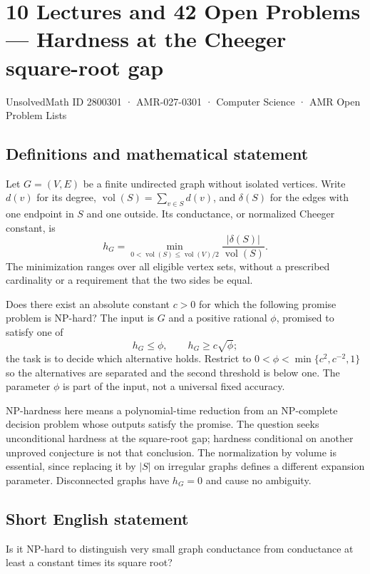 \documentclass[11pt,a4paper]{article}
\begin{document}
\section*{10 Lectures and 42 Open Problems — Hardness at the Cheeger square-root gap}\label{2800301}
{\small UnsolvedMath ID 2800301 · AMR-027-0301 · Computer Science · AMR Open Problem Lists}
\subsection{Definitions and mathematical statement}
Let $G=(V,E)$ be a finite undirected graph without isolated vertices.
Write $d(v)$ for its degree, $\operatorname{vol}(S)=\sum_{v\in S}d(v)$,
and $\delta(S)$ for the edges with one endpoint in $S$ and one outside.
Its conductance, or normalized Cheeger constant, is
\[
 h_G=\min_{0<\operatorname{vol}(S)\le\operatorname{vol}(V)/2}
                   \frac{|\delta(S)|}{\operatorname{vol}(S)}.
\]
The minimization ranges over all eligible vertex sets, without a
prescribed cardinality or a requirement that the two sides be equal.

Does there exist an absolute constant $c>0$ for which the following
promise problem is NP-hard? The input is $G$ and a positive rational
$\phi$, promised to satisfy one of
\[
                 h_G\le\phi,
                 \qquad h_G\ge c\sqrt\phi;
\]
the task is to decide which alternative holds. Restrict to
$0<\phi<\min\{c^2,c^{-2},1\}$ so the alternatives are separated and
the second threshold is below one. The parameter $\phi$ is part of
the input, not a universal fixed accuracy.

NP-hardness here means a polynomial-time reduction from an NP-complete
decision problem whose outputs satisfy the promise. The question seeks
unconditional hardness at the square-root gap; hardness conditional
on another unproved conjecture is not that conclusion. The normalization
by volume is essential, since replacing it by $|S|$ on irregular graphs
defines a different expansion parameter. Disconnected graphs have
$h_G=0$ and cause no ambiguity.
\subsection{Short English statement}
Is it NP-hard to distinguish very small graph conductance from conductance at least a constant times its square root?
\end{document}
